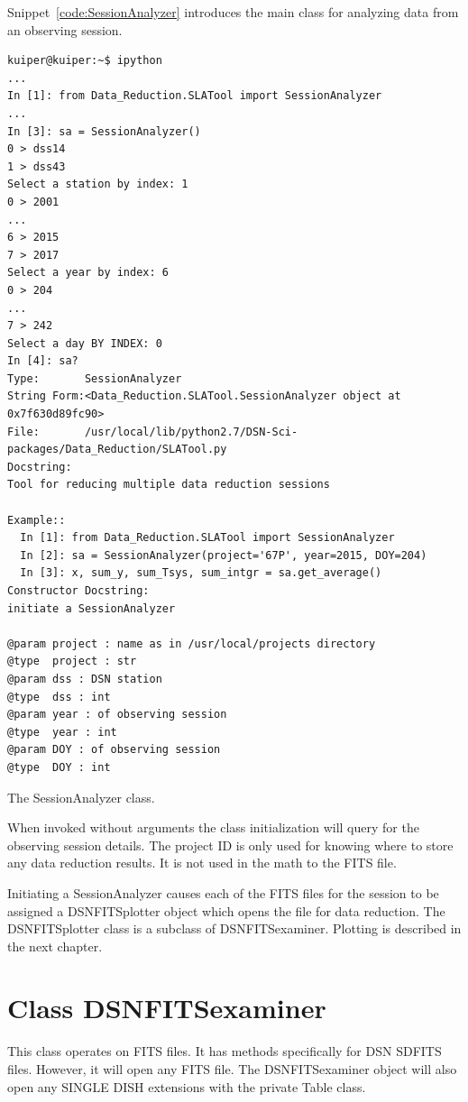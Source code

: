 \documentclass[letterpaper,11pt]{book}
\begin{document}
Snippet~\ref{code:SessionAnalyzer} introduces the main class for analyzing data
from an observing session.
\begin{code}[h!tb]
\begin{center}
{\small \begin{verbatim}
kuiper@kuiper:~$ ipython
...
In [1]: from Data_Reduction.SLATool import SessionAnalyzer
...
In [3]: sa = SessionAnalyzer()
0 > dss14
1 > dss43
Select a station by index: 1
0 > 2001
...
6 > 2015
7 > 2017
Select a year by index: 6
0 > 204
...
7 > 242
Select a day BY INDEX: 0
In [4]: sa?
Type:       SessionAnalyzer
String Form:<Data_Reduction.SLATool.SessionAnalyzer object at 0x7f630d89fc90>
File:       /usr/local/lib/python2.7/DSN-Sci-packages/Data_Reduction/SLATool.py
Docstring:
Tool for reducing multiple data reduction sessions

Example::
  In [1]: from Data_Reduction.SLATool import SessionAnalyzer
  In [2]: sa = SessionAnalyzer(project='67P', year=2015, DOY=204)
  In [3]: x, sum_y, sum_Tsys, sum_intgr = sa.get_average()
Constructor Docstring:
initiate a SessionAnalyzer

@param project : name as in /usr/local/projects directory
@type  project : str
@param dss : DSN station
@type  dss : int
@param year : of observing session
@type  year : int
@param DOY : of observing session
@type  DOY : int
\end{verbatim}
}\caption[Session analayzer class]{\label{code:SessionAnalyzer}The SessionAnalyzer class.}
\end{center}
\end{code}
When invoked without arguments the class initialization will query for the
observing session details.  The project ID is only used for knowing where
to store any data reduction results.  It is not used in the math to the FITS
file.

Initiating a {\ttfamily SessionAnalyzer} causes
each of the FITS files for the session to be assigned a
{\ttfamily DSNFITSplotter} object which opens the file for data reduction.
The {\ttfamily DSNFITSplotter} class is a subclass of {\ttfamily DSNFITSexaminer}.
Plotting is described in the next chapter.

\section{Class {\ttfamily DSNFITSexaminer}}\label{sec:examiner}

This class operates on FITS files.  It has methods specifically for DSN SDFITS
files.  However, it will open any FITS file.  The {\ttfamily DSNFITSexaminer}
object will also open any SINGLE DISH extensions with the private
{\ttfamily Table} class.
\end{document}
